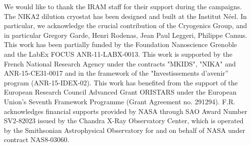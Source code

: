 We would like to thank the IRAM staff for their support during the campaigns. The NIKA2 dilution cryostat has been designed and built at the Institut N\'eel. In particular, we acknowledge the crucial contribution of the Cryogenics Group, and in particular Gregory Garde, Henri Rodenas, Jean Paul Leggeri, Philippe Camus. This work has been partially funded by the Foundation Nanoscience Grenoble and the LabEx FOCUS ANR-11-LABX-0013. This work is supported by the French National Research Agency under the contracts "MKIDS", "NIKA" and ANR-15-CE31-0017 and in the framework of the "Investissements d’avenir” program (ANR-15-IDEX-02). This work has benefited from the support of the European Research Council Advanced Grant ORISTARS under the European Union's Seventh Framework Programme (Grant Agreement no. 291294). F.R. acknowledges financial supports provided by NASA through SAO Award Number SV2-82023 issued by the Chandra X-Ray Observatory Center, which is operated by the Smithsonian Astrophysical Observatory for and on behalf of NASA under contract NAS8-03060. 

